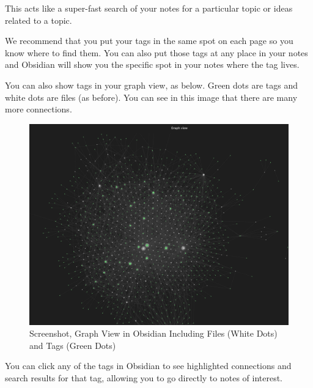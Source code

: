 \documentclass[
  letterpaper,
  DIV=11,
  numbers=noendperiod]{scrreprt}
\begin{document}
This acts like a super-fast search of your notes for a particular topic
or ideas related to a topic.

We recommend that you put your tags in the same spot on each page so you
know where to find them. You can also put those tags at any place in
your notes and Obsidian will show you the specific spot in your notes
where the tag lives.

You can also show tags in your graph view, as below. Green dots are tags
and white dots are files (as before). You can see in this image that
there are many more connections.

\begin{figure}

\caption{\label{fig-graph1}Screenshot, Graph View in Obsidian Including
Files (White Dots) and Tags (Green Dots)}

\includegraphics{assets/u3/graph1.png}

\end{figure}%

You can click any of the tags in Obsidian to see highlighted connections
and search results for that tag, allowing you to go directly to notes of
interest.
\end{document}
